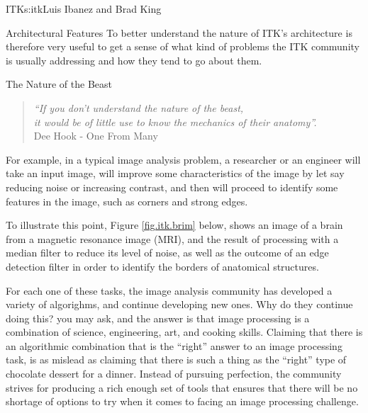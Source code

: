 \begin{aosachapter}{ITK}{s:itk}{Luis Ibanez and Brad King}
\begin{aosasect1}{Architectural Features}
To better understand the nature of ITK's architecture is therefore very useful
to get a sense of what kind of problems the ITK community is usually addressing
and how they tend to go about them.

\begin{aosasect2}{The Nature of the Beast}

\begin{center}
\begin{quotation}
\emph{
``If you don't understand the nature of the beast,\\
it would be of little use to know the mechanics of their anatomy''.\\
}
\hfill Dee Hook - One From Many
\end{quotation}
\end{center}

For example, in a typical image analysis problem, a researcher or an
engineer will take an input image, will improve some characteristics of the
image by let say reducing noise or increasing contrast, and then will proceed
to identify some features in the image, such as corners and strong edges.

To illustrate this point, Figure \ref{fig.itk.brim} below, shows an image of a
brain from a magnetic resonance image (MRI), and the result of processing with
a median filter to reduce its level of noise, as well as the outcome of an edge
detection filter in order to identify the borders of anatomical structures.

%
%

For each one of these tasks, the image analysis community has developed a
variety of algorighms, and continue developing new ones. Why do they continue
doing this? you may ask, and the answer is that image processing is a
combination of science, engineering, art, and cooking skills. Claiming that
there is an algorithmic combination that is the ``right'' answer to an image
processing task, is as mislead as claiming that there is such a thing as the
``right'' type of chocolate dessert for a dinner. Instead of pursuing
perfection, the community strives for producing a rich enough set of tools that
ensures that there will be no shortage of options to try when it comes to
facing an image processing challenge.


\end{aosasect2}
\end{aosasect1}
\end{aosachapter}
